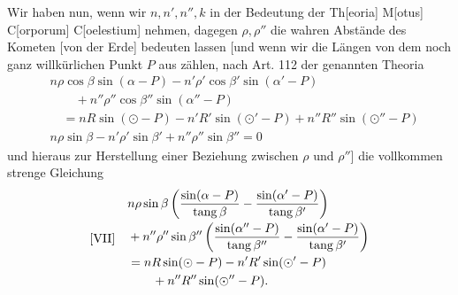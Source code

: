 Wir haben nun, wenn wir \(n,n',n'',k\) in der Bedeutung der Th[eoria] M[otus] C[orporum] C[oelestium] nehmen, dagegen \(\rho,\rho''\) die wahren Abstände des Kometen [von der Erde] bedeuten lassen [und wenn wir die Längen von dem noch ganz willkürlichen Punkt \(P\) aus zählen, nach Art. 112 der genannten
Theoria
\[
\begin{aligned}
&n\rho\cos\beta\sin(\alpha-P)-n'\rho'\cos\beta'\sin(\alpha'-P)\\
&\qquad{}+n''\rho''\cos\beta''\sin(\alpha''-P)\\
&\quad=nR\sin(\odot-P)-n'R'\sin(\odot'-P)+n''R''\sin(\odot''-P)\\
&n\rho\sin\beta-n'\rho'\sin\beta'+n''\rho''\sin\beta''=0
\end{aligned}
\]
und hieraus zur Herstellung einer Beziehung zwischen \(\rho\) und \(\rho''\)] die vollkommen strenge Gleichung
\[
\begin{array}{l@{\quad}l}
[\mathrm{VII}]&\begin{aligned}
&n\rho\sin\beta\left(\frac{\sin(\alpha-P)}{\operatorname{tang}\beta}-\frac{\sin(\alpha'-P)}{\operatorname{tang}\beta'}\right)\\
&{}+n''\rho''\sin\beta''\left(\frac{\sin(\alpha''-P)}{\operatorname{tang}\beta''}-\frac{\sin(\alpha'-P)}{\operatorname{tang}\beta'}\right)\\
&=nR\sin(\odot-P)-n'R'\sin(\odot'-P)\\
&\qquad{}+n''R''\sin(\odot''-P).
\end{aligned}
\end{array}
\]

